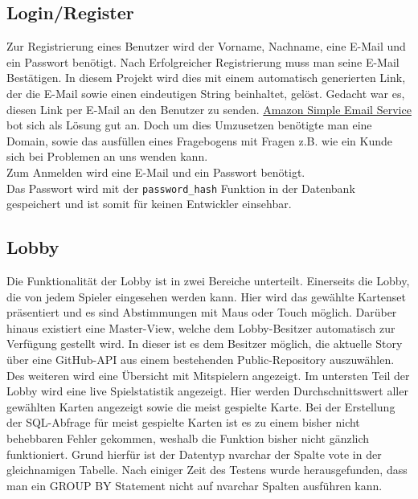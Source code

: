 \subsection{Login/Register}\label{subsec:login/register}
Zur Registrierung eines Benutzer wird der Vorname, Nachname, eine E-Mail und ein Passwort benötigt. Nach Erfolgreicher Registrierung muss man seine E-Mail Bestätigen. In diesem Projekt wird dies mit einem automatisch generierten Link, der die E-Mail sowie einen eindeutigen String beinhaltet, gelöst. Gedacht war es, diesen Link per E-Mail an den Benutzer zu senden. \href{https://aws.amazon.com/de/ses/}{Amazon Simple Email Service} bot sich als Lösung gut an. Doch um dies Umzusetzen benötigte man eine Domain, sowie das ausfüllen eines Fragebogens mit Fragen z.B. wie ein Kunde sich bei Problemen an uns wenden kann.\\
Zum Anmelden wird eine E-Mail und ein Passwort benötigt.\\
Das Passwort wird mit der \lstinline{password_hash} Funktion in der Datenbank gespeichert und ist somit für keinen Entwickler einsehbar.

\subsection{Lobby}\label{subsec:lobby}
Die Funktionalität der Lobby ist in zwei Bereiche unterteilt. Einerseits die Lobby, die von jedem Spieler eingesehen werden kann. Hier wird das gewählte Kartenset präsentiert und es sind Abstimmungen mit Maus oder Touch möglich. Darüber hinaus existiert eine Master-View, welche dem Lobby-Besitzer automatisch zur Verfügung gestellt wird. In dieser ist es dem Besitzer möglich, die aktuelle Story über eine GitHub-API aus einem bestehenden Public-Repository auszuwählen. Des weiteren wird eine Übersicht mit Mitspielern angezeigt. Im untersten Teil der Lobby wird eine live Spielstatistik angezeigt. Hier werden Durchschnittswert aller gewählten Karten angezeigt sowie die meist gespielte Karte. Bei der Erstellung der SQL-Abfrage für meist gespielte Karten ist es zu einem bisher nicht behebbaren Fehler gekommen, weshalb die Funktion bisher nicht gänzlich funktioniert. Grund hierfür ist der Datentyp nvarchar der Spalte vote in der gleichnamigen Tabelle. Nach einiger Zeit des Testens wurde herausgefunden, dass man ein GROUP BY Statement nicht auf nvarchar Spalten ausführen kann. 
